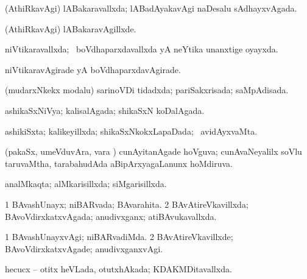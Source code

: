 {\bentry
{} 
\gl{\gu}
\expl{}
\bmng
(AthiRkavAgi) lABakaravallxda; lABadAyakavAgi naDesalu sAdhayxvAgada. 
\emng
\eentry

\bentry
{} 
\gl{\gu}
\expl{}
\bmng
\emng
\eentry

\bentry
{} 
\gl{\kirxvi}
\expl{}
\bmng
 (AthiRkavAgi) lABakaravAgillxde. 
\emng
\eentry

\bentry
{} 
\gl{\gu}
\expl{}
\bmng
 niVtikaravallxda; \kanmu\ boVdhaparxdavallxda yA neYtika unanxtige oyayxda. 
\emng
\eentry

\bentry
{} 
\gl{\kirxvi}
\expl{}
\bmng
 niVtikaravAgirade yA boVdhaparxdavAgirade. 
\emng
\eentry

\bentry
{} 
\gl{\gu}
\bmng
 (mudarxNkekx modalu) sarinoVDi tidadxda; pariSakxrisada; saMpAdisada. 
\emng
\eentry

\bentry
{} 
\gl{\gu}
\expl{}
\bmng
ashikaSxNiVya; kalisalAgada; shikaSxN koDalAgada. 
\emng
\eentry

\bentry
{} 
\gl{\gu}
\expl{}
\bmng
 ashikiSxta; kalikeyillxda; shikaSxNkokxLapaDada; \kanmu\ avidAyxvaMta. 
\emng
\eentry

\bentry
{} 
\gl{\gu}
\expl{}
\bmng
 (pakaSx, umeVduvAra, \mo vara \vi) cunAyitanAgade hoVguva; cunAvaNeyalilx soVlu taruvaMtha, tarabahudAda aBipArxyagaLanunx hoMdiruva. 
\emng
\eentry

\bentry
{} 
\gl{\gu}
\expl{}
\bmng
 analMkaqta; alMkarisillxda; siMgarisillxda. 
\emng
\eentry

\bentry
{} 
\gl{\gu}
\expl{}
\bmng
\bnum
\num{1} BAvashUnayx; niBARvada; BAvarahita. 
\num{2} BAvAtireVkavillxda; BAvoVdirxkatxvAgada; anudivxganx; atiBAvukavallxda. 
\enum
\emng
\eentry

\bentry
{} 
\gl{\kirxvi}
\expl{}
\bmng
\bnum
\num{1} BAvashUnayxvAgi; niBARvadiMda. 
\num{2} BAvAtireVkavillxde; BAvoVdirxkatxvAgade; anudivxganxvAgi. 
\enum
\emng
\eentry

\bentry
{} 
\gl{\gu}
\expl{}
\bmng
 hecucx -- otitx heVLada, otutxhAkada; KDAKMDitavallxda. 
\emng
\eentry

}
